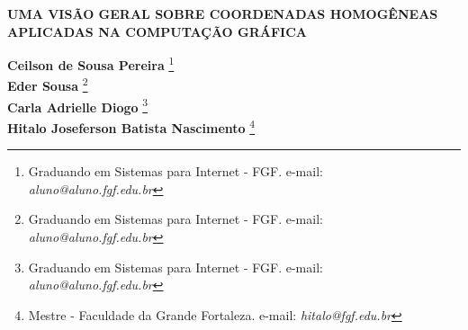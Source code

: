\documentclass[12pt]{article}
\begin{document}

%



\begin{center}
\textbf{\Large{UMA VISÃO GERAL SOBRE COORDENADAS HOMOGÊNEAS APLICADAS NA COMPUTAÇÃO GRÁFICA}}\\
\end{center}

\vspace*{0.2cm}

\begin{flushright}
 {\bf Ceilson de Sousa Pereira} \footnote[1]{Graduando em Sistemas para Internet - FGF. e-mail: \it aluno@aluno.fgf.edu.br}  \\
 {\bf Eder Sousa} \footnote[2]{Graduando em Sistemas para Internet - FGF. e-mail: \it aluno@aluno.fgf.edu.br}  \\
  {\bf Carla Adrielle Diogo} \footnote[3]{Graduando em Sistemas para Internet - FGF. e-mail: \it aluno@aluno.fgf.edu.br}  \\
   {\bf Hitalo Joseferson Batista Nascimento} \footnote[4]{Mestre - Faculdade da Grande Fortaleza. e-mail: \it hitalo@fgf.edu.br}   \\
\end{flushright}

\vspace*{0.5cm}

\end{document}
